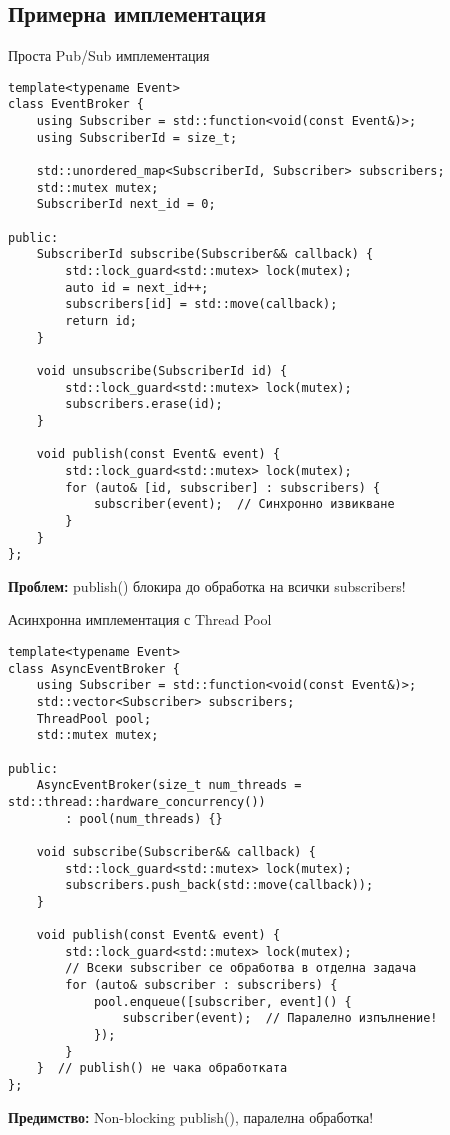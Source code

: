 \documentclass[aspectratio=169]{beamer}
\begin{document}
\subsection{Примерна имплементация}

\begin{frame}[fragile]{Проста Pub/Sub имплементация}
\begin{lstlisting}[basicstyle=\ttfamily\tiny]
template<typename Event>
class EventBroker {
    using Subscriber = std::function<void(const Event&)>;
    using SubscriberId = size_t;
    
    std::unordered_map<SubscriberId, Subscriber> subscribers;
    std::mutex mutex;
    SubscriberId next_id = 0;

public:
    SubscriberId subscribe(Subscriber&& callback) {
        std::lock_guard<std::mutex> lock(mutex);
        auto id = next_id++;
        subscribers[id] = std::move(callback);
        return id;
    }
    
    void unsubscribe(SubscriberId id) {
        std::lock_guard<std::mutex> lock(mutex);
        subscribers.erase(id);
    }

    void publish(const Event& event) {
        std::lock_guard<std::mutex> lock(mutex);
        for (auto& [id, subscriber] : subscribers) {
            subscriber(event);  // Синхронно извикване
        }
    }
};
\end{lstlisting}

\textbf{Проблем:} publish() блокира до обработка на всички subscribers!
\end{frame}

\begin{frame}[fragile]{Асинхронна имплементация с Thread Pool}
\begin{lstlisting}[basicstyle=\ttfamily\tiny]
template<typename Event>
class AsyncEventBroker {
    using Subscriber = std::function<void(const Event&)>;
    std::vector<Subscriber> subscribers;
    ThreadPool pool;
    std::mutex mutex;

public:
    AsyncEventBroker(size_t num_threads = std::thread::hardware_concurrency())
        : pool(num_threads) {}
    
    void subscribe(Subscriber&& callback) {
        std::lock_guard<std::mutex> lock(mutex);
        subscribers.push_back(std::move(callback));
    }

    void publish(const Event& event) {
        std::lock_guard<std::mutex> lock(mutex);
        // Всеки subscriber се обработва в отделна задача
        for (auto& subscriber : subscribers) {
            pool.enqueue([subscriber, event]() {
                subscriber(event);  // Паралелно изпълнение!
            });
        }
    }  // publish() не чака обработката
};
\end{lstlisting}

\textbf{Предимство:} Non-blocking publish(), паралелна обработка!
\end{frame}
\end{document}
